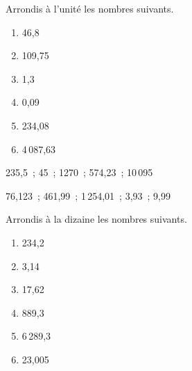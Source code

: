 \begin{exercice}
Arrondis à l'unité les nombres suivants. %
\begin{enumerate}
 \item 46,8 \dotfill \hspace*{13em}
 
 \item 109,75 \dotfill \hspace*{13em}
 
 \item 1,3 \dotfill \hspace*{13em}
 
 \item 0,09 \dotfill \hspace*{13em}
 
 \item 234,08 \dotfill \hspace*{13em}
 
 \item 4\,087,63 \dotfill \hspace*{13em}
 
 \end{enumerate}
\end{exercice}




\begin{exercice}
235,5 ; 45 ; 1270 ; 574,23 ; 10\,095
\end{exercice}


\begin{exercice}
76,123 ; 461,99 ; 1\,254,01 ; 3,93 ; 9,99
\end{exercice}


\begin{exercice}
Arrondis à la dizaine les nombres suivants. %
\begin{enumerate}
 \item 234,2 \dotfill \hspace*{13em}
 
 \item 3,14 \dotfill \hspace*{13em}
 
 \item 17,62 \dotfill \hspace*{13em}
 
 \item 889,3 \dotfill \hspace*{13em}
 
 \item 6\,289,3 \dotfill \hspace*{13em}
 
 \item 23,005 \dotfill \hspace*{13em}
 
 \end{enumerate}
\end{exercice}



